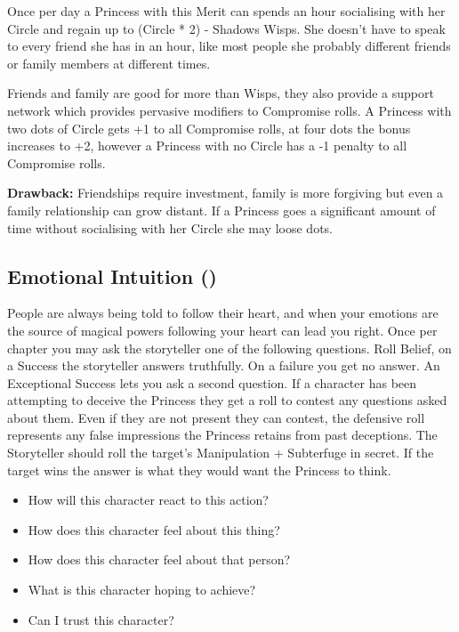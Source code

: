 Once per day a Princess with this Merit can spends an hour socialising with her Circle and regain up to (Circle * 2) - Shadows Wisps. She doesn’t have to speak to every friend she has in an hour, like most people she probably different friends or family members at different times. 

Friends and family are good for more than Wisps, they also provide a support network which provides pervasive modifiers to Compromise rolls. A Princess with two dots of Circle gets +1 to all Compromise rolls, at four dots the bonus increases to +2, however a Princess with no Circle has a -1 penalty to all Compromise rolls.

\textbf{Drawback:} Friendships require investment, family is more forgiving but even a family relationship can grow distant. If a Princess goes a significant amount of time without socialising with her Circle she may loose dots. 

\subsection*{Emotional Intuition (\textbullet\textbullet\textbullet)}

People are always being told to follow their heart, and when your emotions are the source of magical powers following your heart can lead you right. Once per chapter you may ask the storyteller one of the following questions. Roll Belief, on a Success the storyteller answers truthfully. On a failure you get no answer. An Exceptional Success lets you ask a second question. If a character has been attempting to deceive the Princess they get a roll to contest any questions asked about them. Even if they are not present they can contest, the defensive roll represents any false impressions the Princess retains from past deceptions. The Storyteller should roll the target's Manipulation + Subterfuge in secret. If the target wins the answer is what they would want the Princess to think.

\begin{itemize}
 \item How will this character react to this action?
 \item How does this character feel about this thing?
 \item How does this character feel about that person?
 \item What is this character hoping to achieve? 
 \item Can I trust this character? 
\end{itemize}



